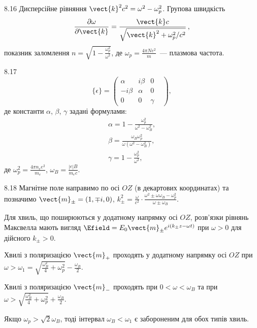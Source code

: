 \begin{Solution}{8.{16}}
Дисперсійне рівняння $ \vect{k}^2c^2=\omega^2-\omega_p^2$. Групова швидкість
\begin{equation*}
    \frac{\partial \omega}{\partial \vect{k}}=\frac{\vect{k} c}{\sqrt{\vect{k}^2+\omega_p^2/c^2}}\,,
\end{equation*}
показник заломлення
	$n = \sqrt{1 - \frac{\omega_p^2}{\omega^2}}$, де $\omega_p = \frac{4\pi N e^2}{m}$~--- плазмова
	частота.
\end{Solution}
\begin{Solution}{8.{17}}
	\begin{equation*}
		\{ \epsilon \}  = \left( {\begin{array}{*{20}{c}}
				\alpha       & {i\beta } & 0      & \\
				{ - i\beta } & \alpha    & 0      & \\
				0            & 0         & \gamma &
			\end{array}} \right),
	\end{equation*}
	де константи $\alpha$, $\beta$, $\gamma$ задані формулами:
	\begin{align*}
		\alpha =  1 - \frac{\omega_p^2}{\omega ^2 - \omega _B^2},           \\
		\beta = \frac{\omega_B\omega_p^2}{\omega(\omega ^2 - \omega _B^2)}, \\
		\gamma = 1 - \frac{\omega _p^2}{\omega ^2},
	\end{align*}
	де $\omega _p^2 = \frac{4\pi n_e e^2}{m_e}$, $\omega_B = \frac{\left| e \right|B}{m_ec}$.
\end{Solution}
\begin{Solution}{8.{18}}
	Магнітне поле направимо по осі $OZ$ (в декартових координатах) та позначимо \(\vect{m}_{\pm} = (1,
	\mp i,0)\), \(k_\pm^2 = \frac{\omega }{c^2} \cdot \frac{\omega^2 \pm \omega \omega_B -
	\omega_p^2}{\omega  \pm \omega_B}\).

	Для хвиль, що поширюються у додатному напрямку осі $OZ$, розв'язки рівнянь Максвелла мають вигляд
	$\Efield = E_0\vect{m}_{\pm} e^{i(k_\pm z - \omega t)}$ при $\omega > 0$ для дійсного $k_{\pm} >0$.

	Хвилі з поляризацією $\vect{m}_+$ проходять у додатному напрямку осі $OZ$ при \(\omega  > \omega_1
	= \sqrt {\frac{{\omega_B^2}}{4} + \omega_p^2}  - \frac{\omega _B}{2}\).

	Хвилі з поляризацією $\vect{m}_-$ проходять при \(0<\omega<\omega_B\)  та при\\\(\omega  > \sqrt
	{\frac{\omega_B^2}{4} + \omega_p^2}  + \frac{\omega _B}{2}\).

	Якщо \({\omega _p} > \sqrt 2 {\omega _B}\), тоді  інтервал \(\omega_B  <  \omega_1 \)  є
	забороненим для обох типів хвиль.
\end{Solution}
